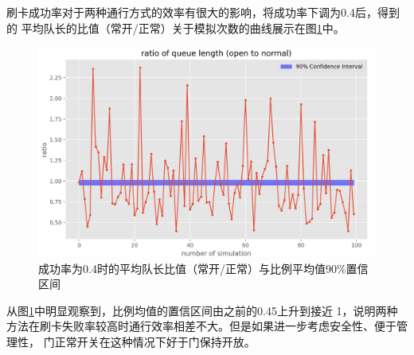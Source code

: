 \par 刷卡成功率对于两种通行方式的效率有很大的影响，将成功率下调为0.4后，得到的
平均队长的比值（常开/正常）关于模拟次数的曲线展示在图\ref{fig:low-success-rate}中。
\begin{figure}[ht]
    \centering
    \includegraphics[width=.7\textwidth]{images/ratio_low_success_rate.png}
    \caption{成功率为0.4时的平均队长比值（常开/正常）与比例平均值90\%置信区间}
    \label{fig:low-success-rate}
\end{figure}
从图\ref{fig:low-success-rate}中明显观察到，比例均值的置信区间由之前的0.45上升到接近
1，说明两种方法在刷卡失败率较高时通行效率相差不大。但是如果进一步考虑安全性、便于管理性，
门正常开关在这种情况下好于门保持开放。